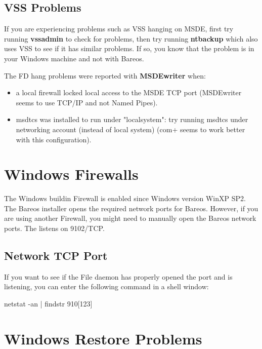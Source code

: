 \subsection{VSS Problems}


If you are experiencing problems such as VSS hanging on MSDE, first try
running {\bf vssadmin} to check for problems, then try running {\bf
ntbackup} which also uses VSS to see if it has similar problems. If so, you
know that the problem is in your Windows machine and not with Bareos.

The FD hang problems were reported with {\bf MSDEwriter} when:
\begin{itemize}
\item a local firewall locked local access to the MSDE TCP port (MSDEwriter
seems to use TCP/IP and not Named Pipes).
\item msdtcs was installed to run under "localsystem": try running msdtcs
under  networking account (instead of local system) (com+ seems to work
better with this configuration).
\end{itemize}


\section{Windows Firewalls}

The Windows buildin Firewall is enabled since Windows version WinXP SP2.
The Bareos installer opens the required network ports for Bareos.
However, if you are using another Firewall, you might need to manually open the Bareos network ports.
The \bareosFd listens on 9102/TCP.

\subsection{Network TCP Port}

If you want to see if the File daemon has properly opened the port and is
listening, you can enter the following command in a shell window:

\begin{commands}{}
netstat -an | findstr 910[123]
\end{commands}



\section{Windows Restore Problems}

